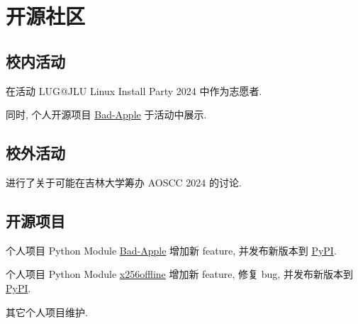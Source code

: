 \documentclass[a4paper]{article}
\begin{document}
\section{开源社区}

\subsection{校内活动}

在活动 LUG@JLU Linux Install Party 2024 中作为志愿者.

同时, 个人开源项目 \href{https://github.com/bad-apple-lab/Bad-Apple-Python-Module}{Bad-Apple} 于活动中展示.

\subsection{校外活动}

进行了关于可能在吉林大学筹办 AOSCC 2024 的讨论.

\subsection{开源项目}

个人项目 Python Module \href{https://github.com/bad-apple-lab/Bad-Apple-Python-Module}{Bad-Apple} 增加新 feature, 并发布新版本到 \href{https://pypi.org/project/badapple/}{PyPI}.

个人项目 Python Module \href{https://github.com/userElaina/python-x256-offline}{x256offline} 增加新 feature, 修复 bug, 并发布新版本到 \href{https://pypi.org/project/badapple/}{PyPI}.

其它个人项目维护.
\end{document}
